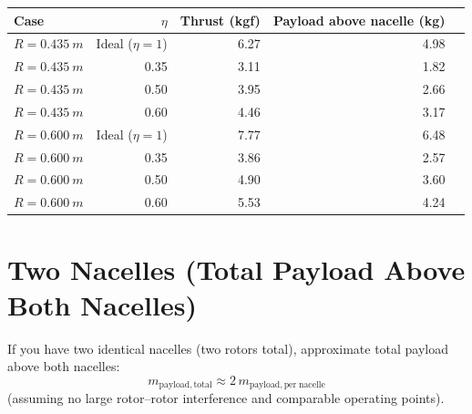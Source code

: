 \documentclass[11pt]{article}
\begin{document}
\bigskip
\noindent{}
\begin{center}
\begin{tabular}{@{}lrrrr@{}}
\toprule
Case & $\eta$ & Thrust (kgf) & Payload above nacelle (kg) \\
\midrule
$R=\SI{0.435}{m}$ & Ideal ($\eta=1$) & 6.27 & 4.98 \\
$R=\SI{0.435}{m}$ & 0.35 & 3.11 & 1.82 \\
$R=\SI{0.435}{m}$ & 0.50 & 3.95 & 2.66 \\
$R=\SI{0.435}{m}$ & 0.60 & 4.46 & 3.17 \\
\midrule
$R=\SI{0.600}{m}$ & Ideal ($\eta=1$) & 7.77 & 6.48 \\
$R=\SI{0.600}{m}$ & 0.35 & 3.86 & 2.57 \\
$R=\SI{0.600}{m}$ & 0.50 & 4.90 & 3.60 \\
$R=\SI{0.600}{m}$ & 0.60 & 5.53 & 4.24 \\
\bottomrule
\end{tabular}
\end{center}

\section{Two Nacelles (Total Payload Above Both Nacelles)}
If you have two identical nacelles (two rotors total), approximate total payload above both nacelles:
\[
m_{\mathrm{payload,total}} \approx 2\,m_{\mathrm{payload,per\;nacelle}}
\]
(assuming no large rotor--rotor interference and comparable operating points).
\end{document}

